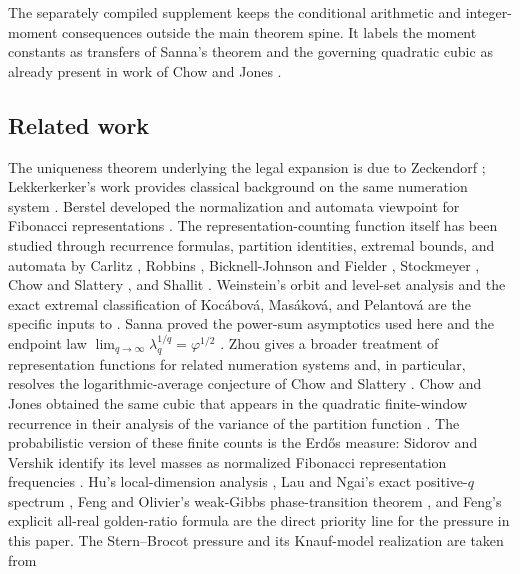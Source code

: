 The separately compiled supplement keeps the conditional arithmetic and
integer-moment consequences outside the main theorem spine.  It labels the
moment constants as transfers of Sanna's theorem and the governing quadratic
cubic as already present in work of Chow and Jones \cite{ChowJones2024}.

\subsection{Related work}

The uniqueness theorem underlying the legal expansion is due to Zeckendorf
\cite{Zeckendorf1972}; Lekkerkerker's work provides classical background on
the same numeration system \cite{Lekkerkerker1952}.  Berstel developed the
normalization and automata viewpoint for Fibonacci representations
\cite{Berstel2001}.  The representation-counting function itself has been
studied through recurrence formulas, partition identities, extremal bounds,
and automata by Carlitz \cite{Carlitz1968}, Robbins \cite{Robbins1996},
Bicknell-Johnson and Fielder \cite{BicknellJohnsonFielder1999}, Stockmeyer
\cite{Stockmeyer2008}, Chow and Slattery \cite{ChowSlattery2021}, and Shallit
\cite{Shallit2021}.  Weinstein's orbit and level-set analysis
\cite{Weinstein2016} and the exact extremal classification of Koc\'abov\'a,
Mas\'akov\'a, and Pelantov\'a \cite{KocabovaMasakovaPelantova2005} are the
specific inputs to .  Sanna proved the power-sum
asymptotics used here and the endpoint law
\(\lim_{q\to\infty}\lambda_q^{1/q}=\varphi^{1/2}\)
\cite[Thms.~1.1 and~1.2]{Sanna2025}.  Zhou gives a broader treatment of
representation functions for related numeration systems and, in particular,
resolves the logarithmic-average conjecture of Chow and Slattery
\cite[Cor.~1.5]{Zhou2023}.
Chow and Jones obtained the same cubic that appears in the quadratic
finite-window recurrence in their analysis of the variance of the partition
function \cite{ChowJones2024}.
The probabilistic version of these finite counts is the Erd\H{o}s measure:
Sidorov and Vershik identify its level masses as normalized Fibonacci
representation frequencies \cite{SidorovVershik1998}.  Hu's local-dimension
analysis \cite{Hu1997}, Lau and Ngai's exact positive-\(q\) spectrum
\cite{LauNgai1998}, Feng and Olivier's weak-Gibbs phase-transition theorem
\cite{FengOlivier2003}, and Feng's explicit all-real golden-ratio formula
\cite{Feng2005} are the direct priority line for the pressure in this paper.
The Stern--Brocot pressure and its Knauf-model realization are taken from
